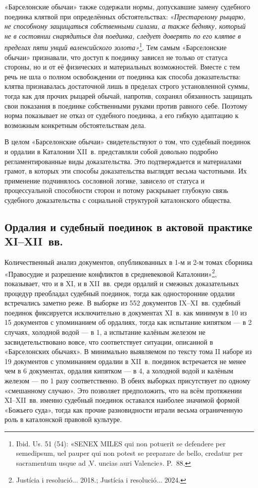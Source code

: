 «Барселонские обычаи» также содержали нормы, допускавшие замену судебного поединка клятвой при определённых обстоятельствах: «\emph{Престарелому рыцарю, не способному защищаться собственными силами, а также бедняку, который не в состоянии снарядиться для поединка, следует доверять по его клятве в пределах пяти унций валенсийского золота»}\footnote{Ibid. Us. 51 (54): «SENEX MILES qui non potuerit se defendere per semedipsum, uel pauper qui non potest se preparare de bello, credatur per sacramentum usque ad ‚V. uncias auri Valencie». P.~88.}. Тем самым «Барселонские обычаи» признавали, что доступ к поединку зависел не только от статуса стороны, но и от её физических и материальных возможностей. Вместе с тем речь не шла о полном освобождении от поединка как способа доказательства: клятва признавалась достаточной лишь в пределах строго установленной суммы, тогда как для прочих рыцарей обычай, напротив, сохранял обязанность защищать свои показания в поединке собственными руками против равного себе. Поэтому норма показывает не отказ от судебного поединка, а его гибкую адаптацию к возможным конкретным обстоятельствам дела.

В целом «Барселонские обычаи» свидетельствуют о том, что судебный поединок и ордалии в Каталонии XII~в. представляли собой довольно подробно регламентированные виды доказательства. Это подтверждается и материалами грамот, в которых эти способы доказательства выглядят весьма частотными. Их применение подчинялось сословной логике, зависело от статуса и процессуальной способности сторон и потому раскрывает глубокую связь судебного доказательства с социальной структурой каталонского общества.

\subsection{Ордалия и судебный поединок в актовой практике XI--XII~вв.}

Количественный анализ документов, опубликованных в 1-м и 2-м томах сборника «Правосудие и разрешение конфликтов в средневековой Каталонии»\footnote{Justícia i resolució... 2018.; Justícia i resolució... 2024.}, показывает, что и в XI, и в XII~вв. среди ордалий и смежных доказательных процедур преобладал судебный поединок, тогда как односторонние ордалии встречались заметно реже. В выборке из 552 документов IX--XI~вв. судебный поединок фиксируется исключительно в документах XI~в. как минимум в 10 из 15 документов с упоминанием об ордалиях, тогда как испытание кипятком --- в 2 случаях, холодной водой --- в 1, а испытание калёным железом не засвидетельствовано вовсе, что соответствует ситуации, описанной в «Барселонских обычаях». В минимально выявляемом по тексту тома II наборе из 19 документов с упоминанием ордалии в XII~в. поединок встречается не менее чем в 6 документах, ордалия кипятком --- в 4, а холодной водой и калёным железом --- по 1 разу соответственно. В обеих выборках присутствует по одному «смешанному случаю». Это позволяет предположить, что на всём протяжении XI--XII~вв. именно судебный поединок оставался наиболее значимой формой «Божьего суда», тогда как прочие разновидности играли весьма ограниченную роль в каталонской правовой культуре.

